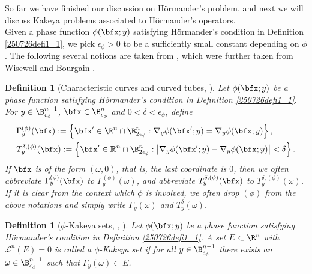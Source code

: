 \documentclass{article}
\numberwithin{equation}{section}
\theoremstyle{plain}
\newtheorem{definition}[theorem]{Definition}
\begin{document}
So far we have finished our discussion on H\"ormander's problem, and next we will discuss Kakeya problems associated to H\"ormander's operators. \\


Given a phase function $\phi(\bfx; y)$ satisfying H\"ormander's condition in Definition \ref{250726defi1_1}, we pick $\epsilon_{\phi}>0$ to be a sufficiently small constant depending on $\phi$. The following several notions are taken from \cite{DGGZ24}, which were further taken from Wisewell \cite{Wis05} and Bourgain \cite{Bou91}.   






\begin{definition}[Characteristic curves and curved tubes, \cite{Bou91}]
Let $\phi(\bfx; y)$ be a phase function satisfying H\"ormander's condition in Definition \ref{250726defi1_1}. 
For $y\in \B^{n-1}_{\epsilon_{\phi}}$, $\bfx\in \B^{n}_{\epsilon_{\phi}}$ and $0< \delta< \epsilon_{\phi}$, define
\begin{equation}
\begin{aligned}
& \Gamma^{(\phi)}_y(\bfx):=\left\{\bfx' \in \R^n\cap \B^n_{2\epsilon_{\phi}}: \nabla_y \phi(\bfx'; y)=\nabla_y \phi(\bfx; y)\right\}, \\
& T_y^{\delta, (\phi)}(\bfx):=\left\{\bfx' \in \mathbb{R}^n\cap \B^n_{2\epsilon_{\phi}}:\left|\nabla_y \phi(\bfx'; y)-\nabla_y \phi(\bfx; y)\right|<\delta\right\}.
\end{aligned}
\end{equation}
If $\bfx$ is of the form $(\omega, 0)$, that is, the last coordinate is $0$, then we often abbreviate $\Gamma^{(\phi)}_y(\bfx)$ to $\Gamma^{(\phi)}_y(\omega)$, and abbreviate $T_y^{\delta, (\phi)}(\bfx)$ to $T_y^{\delta, (\phi)}(\omega)$. If it is clear from the context which $\phi$ is involved, we often drop $(\phi)$ from the above notations and simply write $\Gamma_y(\omega)$ and $T_y^{\delta}(\omega)$. 
\end{definition}






\begin{definition}[$\phi$-Kakeya sets, \cite{Bou91}, \cite{Wis05}]
Let $\phi(\bfx; y)$ be a phase function satisfying H\"ormander's condition in Definition \ref{250726defi1_1}.  A set $E\subset \R^n$ with $\mathcal{L}^n(E)=0$ is called a $\phi$-Kakeya set if for all $y\in \B^{n-1}_{\epsilon_{\phi}}$ there exists an $\omega\in \B^{n-1}_{\epsilon_{\phi}}$ such that $\Gamma_y(\omega)\subset E$. 
\end{definition}
\end{document}

